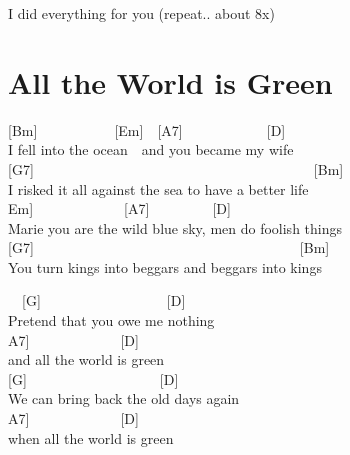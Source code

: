 \documentclass[
  letterpaper,
  a5paper]{memoir}
\begin{document}
I did everything for you (repeat.. about 8x)

\hypertarget{all-the-world-is-green}{%
\chapter{All the World is Green}\label{all-the-world-is-green}}

{[}Bm{]}~~~~~~~~~~~{[}Em{]}~~{[}A7{]}~~~~~~~~~~~~{[}D{]}\\
I fell into the ocean~~and you became my wife\\
{[}G7{]}~~~~~~~~~~~~~~~~~~~~~~~~~~~~~~~~~~~~~~~~{[}Bm{]}\\
I risked it all against the sea to have a better life\\
\hspace*{0.333em}\hspace*{0.333em}\hspace*{0.333em}\hspace*{0.333em}\hspace*{0.333em}\hspace*{0.333em}\hspace*{0.333em}\hspace*{0.333em}\hspace*{0.333em}\hspace*{0.333em}{[}Em{]}~~~~~~~~~~~~~{[}A7{]}~~~~~~~~~{[}D{]}\\
Marie you are the wild blue sky, men do foolish things\\
{[}G7{]}~~~~~~~~~~~~~~~~~~~~~~~~~~~~~~~~~~~~~~{[}Bm{]}\\
You turn kings into beggars and beggars into kings

~~{[}G{]}~~~~~~~~~~~~~~~~~~{[}D{]}\\
Pretend that you owe me nothing~~~~~~\\
\hspace*{0.333em}\hspace*{0.333em}\hspace*{0.333em}{[}A7{]}~~~~~~~~~~~~~{[}D{]}\\
and all the world is green\\
{[}G{]}~~~~~~~~~~~~~~~~~~~{[}D{]}~~~~~~~~\\
We can bring back the old days again~~~~~\\
\hspace*{0.333em}\hspace*{0.333em}\hspace*{0.333em}\hspace*{0.333em}{[}A7{]}~~~~~~~~~~~~~{[}D{]}\\
when all the world is green
\end{document}
